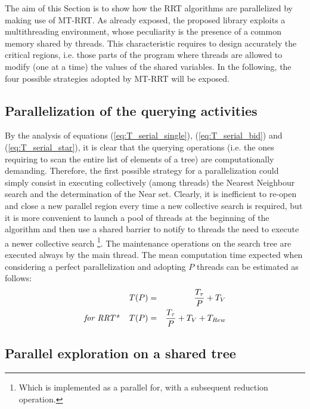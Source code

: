 The aim of this Section is to show how the RRT algorithms are parallelized by making use of MT-RRT.
As already exposed, the proposed library exploits a multithreading environment, whose peculiarity is the presence of a common memory shared by threads. This characteristic requires to design accurately the critical regions, i.e. those parts of the program where threads are allowed to modify (one at a time) the values of the shared variables. 
In the following, the four possible strategies adopted by MT-RRT will be exposed.

\subsection{Parallelization of the querying activities}
\label{subsec:MT_01}

By the analysis of equations (\ref{eq:T_serial_single}), (\ref{eq:T_serial_bid}) and (\ref{eq:T_serial_star}), it is clear that the querying operations (i.e. the ones requiring to scan the entire list of elements of a tree) are computationally demanding. Therefore, the first possible strategy for a parallelization could simply consist in executing collectively (among threads) the Nearest Neighbour search and the determination of the Near set.
Clearly, it is inefficient to re-open and close a new parallel region every time a new collective search is required, but it is more convenient to launch a pool of threads at the beginning of the algorithm and then use a shared barrier to notify to threads the need to execute a newer collective search \footnote{Which is implemented as a parallel for, with a subsequent reduction operation.}. 
The maintenance operations on the search tree are executed always by the main thread.
The mean computation time expected when considering a perfect parallelization and adopting $P$ threads can be estimated as follows:
\begin{eqnarray}
T(P) &=& \frac{T_{\tau}}{P} + T_V \nonumber\\
\textit{for RRT*  \,\,\,\,\,} T(P) &=& \frac{T_{\tau}}{P} + T_V + T_{Rew} 
\end{eqnarray}
  
\subsection{Parallel exploration on a shared tree}
\label{subsec:MT_02}

